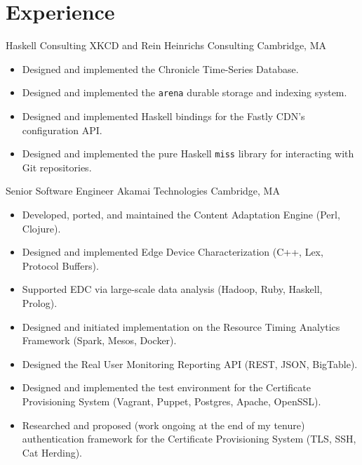 \documentclass[10pt,letterpaper,sans]{moderncv}
\begin{document}
\makecvtitle

\section{Experience}

        {Haskell Consulting}
        {XKCD and Rein Heinrichs Consulting}
        {Cambridge, MA}
        {}
        {%
          \begin{itemize}
          \item Designed and implemented the Chronicle Time-Series Database.
          \item Designed and implemented the \texttt{arena} durable storage and indexing system.
          \item Designed and implemented Haskell bindings for the Fastly CDN's configuration API.
          \item Designed and implemented the pure Haskell \texttt{miss} library for interacting with
            Git repositories.
          \end{itemize}
        }

        {Senior Software Engineer}
        {Akamai Technologies}
        {Cambridge, MA}
        {}
        {%
          \begin{itemize}
          \item Developed, ported, and maintained the Content Adaptation Engine (Perl, Clojure).
          \item Designed and implemented Edge Device Characterization (C++, Lex, Protocol Buffers).
          \item Supported EDC via large-scale data analysis (Hadoop, Ruby, Haskell, Prolog).
          \item Designed and initiated implementation on the Resource Timing Analytics Framework
            (Spark, Mesos, Docker).
          \item Designed the Real User Monitoring Reporting API (REST, JSON, BigTable).
          \item Designed and implemented the test environment for the Certificate Provisioning
            System (Vagrant, Puppet, Postgres, Apache, OpenSSL).
          \item Researched and proposed (work ongoing at the end of my tenure) authentication
            framework for the Certificate Provisioning System (TLS, SSH, Cat Herding).
          \end{itemize}
        }
\end{document}

